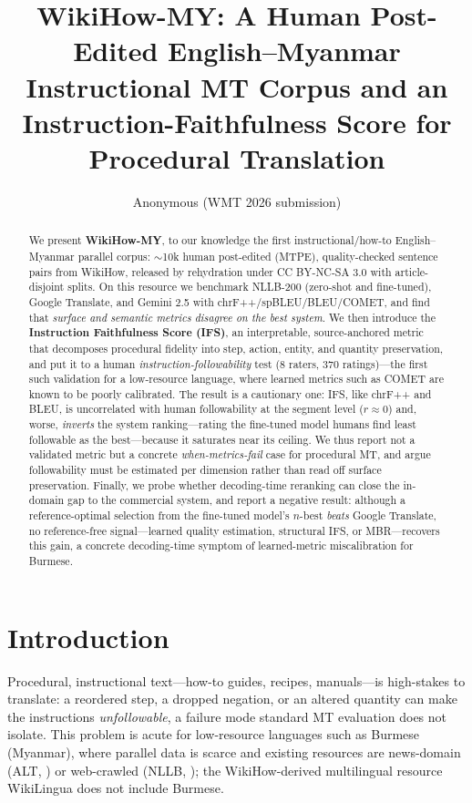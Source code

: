 \documentclass[11pt]{article}
\title{WikiHow-MY: A Human Post-Edited English--Myanmar Instructional MT Corpus
and an Instruction-Faithfulness Score for Procedural Translation}
\author{Anonymous (WMT 2026 submission)}
\date{}
\begin{document}
\maketitle

\begin{abstract}
We present \textbf{WikiHow-MY}, to our knowledge the first instructional/how-to
English--Myanmar parallel corpus: $\sim$10k human post-edited (MTPE), quality-checked
sentence pairs from WikiHow, released by rehydration under CC BY-NC-SA 3.0 with
article-disjoint splits. On this resource we benchmark NLLB-200 (zero-shot and
fine-tuned), Google Translate, and Gemini 2.5 with chrF++/spBLEU/BLEU/COMET, and find
that \emph{surface and semantic metrics disagree on the best system}. We then introduce
the \textbf{Instruction Faithfulness Score (IFS)}, an interpretable, source-anchored
metric that decomposes procedural fidelity into step, action, entity, and quantity
preservation, and put it to a human \emph{instruction-followability} test (8 raters, 370
ratings)---the first such validation for a low-resource language, where learned metrics such as
COMET are known to be poorly calibrated. The result is a cautionary one: IFS, like chrF++ and
BLEU, is uncorrelated with human followability at the segment level ($r{\approx}0$) and, worse,
\emph{inverts} the system ranking---rating the fine-tuned model humans find least followable as
the best---because it saturates near its ceiling. We thus report not a validated metric but a
concrete \emph{when-metrics-fail} case for procedural MT, and argue followability must be
estimated per dimension rather than read off surface preservation.
Finally, we probe whether decoding-time reranking can close the in-domain gap to the
commercial system, and report a negative result: although a reference-optimal selection
from the fine-tuned model's $n$-best \emph{beats} Google Translate, no reference-free
signal---learned quality estimation, structural IFS, or MBR---recovers this gain, a
concrete decoding-time symptom of learned-metric miscalibration for Burmese.
\end{abstract}

\section{Introduction}
Procedural, instructional text---how-to guides, recipes, manuals---is high-stakes to
translate: a reordered step, a dropped negation, or an altered quantity can make the
instructions \emph{unfollowable}, a failure mode standard MT evaluation does not isolate.
This problem is acute for low-resource languages such as Burmese (Myanmar), where parallel
data is scarce and existing resources are news-domain (ALT, \citealp{alt2016}) or
web-crawled (NLLB, \citealp{nllb2024}); the WikiHow-derived multilingual resource
WikiLingua \citep{wikilingua2020} does not include Burmese.
\end{document}
